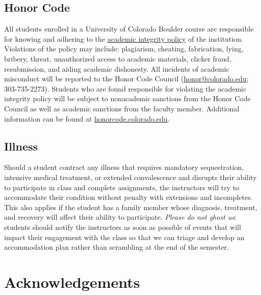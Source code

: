 \documentclass[10pt]{memoir}
\begin{document}
\subsection{Honor Code}
All students enrolled in a University of Colorado Boulder course are responsible for knowing and adhering to the \href{http://www.colorado.edu/policies/academic-integrity-policy}{academic integrity policy} of the institution. Violations of the policy may include: plagiarism, cheating, fabrication, lying, bribery, threat, unauthorized access to academic materials, clicker fraud, resubmission, and aiding academic dishonesty. All incidents of academic misconduct will be reported to the Honor Code Council (\href{mailto:honor@colorado.edu}{honor@colorado.edu}; 303-735-2273). Students who are found responsible for violating the academic integrity policy will be subject to nonacademic sanctions from the Honor Code Council as well as academic sanctions from the faculty member. Additional information can be found at \href{http://honorcode.colorado.edu}{honorcode.colorado.edu}. 

\subsection{Illness}
Should a student contract any illness that requires mandatory sequestration, intensive medical treatment, or extended convalescence and disrupts their ability to participate in class and complete assignments, the instructors will try to accommodate their condition without penalty with extensions and incompletes. This also applies if the student has a family member whose diagnosis, treatment, and recovery will affect their ability to participate. \textit{Please do not ghost us}: students should notify the instructors as soon as possible of events that will impact their engagement with the class so that we can triage and develop an accommodation plan rather than scrambling at the end of the semester.

\section{Acknowledgements}
\end{document}

